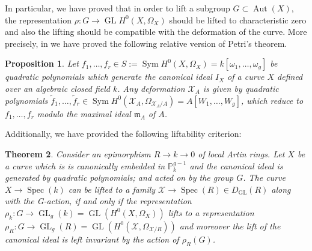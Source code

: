 \documentclass[11pt,letterpaper]{amsart}
\newtheorem{theorem}{Theorem}
\newtheorem{proposition}[theorem]{Proposition}
\theoremstyle{definition}
\DeclareMathOperator\Aut{Aut}
\DeclareMathOperator\Gl {GL}
\DeclareMathOperator\Sym{Sym}
\DeclareMathOperator{\Spe}{Spec}
\begin{document}
 
In particular, we have proved that in order to lift a subgroup $G \subset \Aut(X)$, the representation $\rho:G\rightarrow \Gl H^0(X,\Omega_X)$ should be lifted to characteristic zero and also the lifting should be compatible with the deformation of the curve. More precisely, in \cite{2101.11084} we have proved 
the following relative version of Petri's theorem.
\begin{proposition}
\label{red-new-prot}
Let $f_1,\ldots,f_r \in S:=\Sym H^0(X,\Omega_X)=k[\omega_1,\ldots,\omega_g]$ be quadratic polynomials which generate the canonical ideal $I_{X}$ of a curve $X$ defined over an algebraic closed field $k$. Any deformation 
$\mathcal{X}_A$ is given by quadratic polynomials $\tilde{f}_1,\ldots,\tilde{f}_r \in \Sym H^0(\mathcal{X}_A,\Omega_{\mathcal{X}_A/A})=A[W_1,\ldots,W_g]$, which reduce to $f_1,\ldots,f_r$ modulo the maximal ideal 
$\mathfrak{m}_A$ of $A$. 
\end{proposition}
Additionally, we have provided the following liftability criterion:
\begin{theorem}
\label{th:main-lift}
Consider an epimorphism $R\rightarrow k \rightarrow 0$ of local Artin rings.
Let $X$ be a curve which is is canonically embedded in $\mathbb{P}^{g-1}_k$ and the canonical ideal is generated by quadratic polynomials; and acted on by the group $G$. 
The curve $X \rightarrow \Spe(k)$ can be lifted to a family $\mathcal{X} \rightarrow \Spe(R) \in D_{\Gl }(R)$ along with the G-action, if and only if the representation $\rho_k :G \rightarrow \Gl _g(k)=\Gl (H^0(X,\Omega_X))$ lifts to a representation  $\rho_{R}:G \rightarrow \Gl _g(R)= 
\Gl (H^0(\mathcal{X},\Omega_{\mathcal{X}/R}))$  and moreover the lift of the canonical ideal is left invariant by the action of $\rho_R(G)$. 
\end{theorem}
\end{document}
